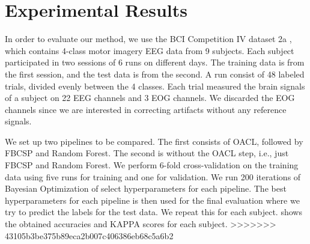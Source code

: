 \section{Experimental Results}
In order to evaluate our method, we use the BCI Competition IV dataset 2a \citep{brunner2008bci}, which contains 4-class motor imagery EEG data from 9 subjects. Each subject participated in two sessions of 6 runs on different days. The training data is from the first session, and the test data is from the second. A run consist of 48 labeled trials, divided evenly between the 4 classes. Each trial measured the brain signals of a subject on 22 EEG channels and 3 EOG channels. We discarded the EOG channels since we are interested in correcting artifacts without any reference signals.

We set up two pipelines to be compared. The first consists of OACL, followed by FBCSP and Random Forest. The second is without the OACL step, i.e., just FBCSP and Random Forest. We perform 6-fold cross-validation on the training data using five runs for training and one for validation. We run 200 iterations of Bayesian Optimization of select hyperparameters for each pipeline. The best hyperparameters for each pipeline is then used for the final evaluation where we try to predict the labels for the test data. We repeat this for each subject.  shows the obtained accuracies and KAPPA scores for each subject.
>>>>>>> 43105b3be375b89eca2b007c406386eb68c5a6b2

